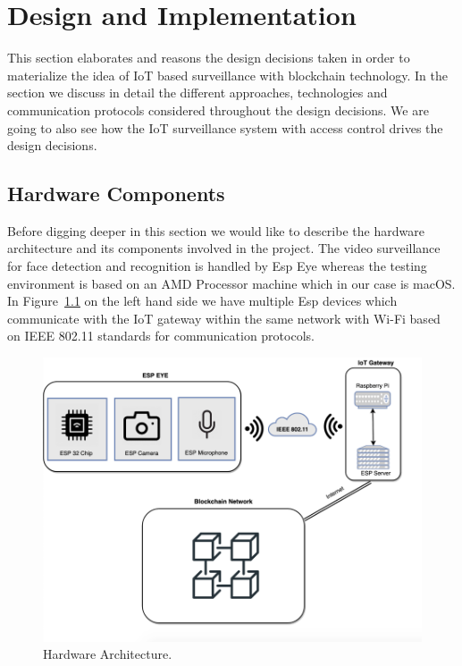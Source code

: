 \chapter{Design and Implementation}
\label{chap:cran_for_lora}

This section elaborates and reasons the design decisions taken in order to materialize the idea of IoT based surveillance with blockchain technology. In the section we discuss in detail the different approaches, technologies and communication protocols considered throughout the design decisions. We are going to also see how the IoT surveillance system with access control drives the design decisions. 





\section{Hardware Components}

Before digging deeper in this section we would like to describe the hardware architecture and its components involved in the project.
The video surveillance for face detection and recognition is handled by Esp Eye whereas the testing environment is based on an AMD Processor machine which in our case is macOS.
In Figure~\ref{fig:hardarchitecture} on the left hand side we have multiple Esp devices which communicate with the IoT gateway within the same network with Wi-Fi based on IEEE 802.11 standards for communication protocols. 

\begin{figure}[!htb]
    \centering
    \includegraphics[width=1\textwidth]{figures/surveillance1.png}
    \caption{Hardware Architecture.}
    \label{fig:hardarchitecture}
\end{figure}


